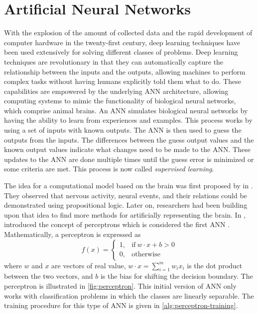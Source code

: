 \section{Artificial Neural Networks}

With the explosion of the amount of collected data and the rapid development of computer hardware in the twenty-first century, deep learning techniques have been used extensively for solving different classes of problems.
Deep learning techniques are revolutionary in that they can automatically capture the relationship between the inputs and the outputs, allowing machines to perform complex tasks without having humans explicitly told them what to do.
These capabilities are empowered by the underlying \gls{ANN} architecture, allowing computing systems to mimic the functionality of biological neural networks, which comprise animal brains.
An \gls{ANN} simulates biological neural networks by having the ability to learn from experiences and examples.
This process works by using a set of inputs with known outputs.
The \gls{ANN} is then used to guess the outputs from the inputs.
The differences between the guess output values and the known output values indicate what changes need to be made to the \gls{ANN}.
These updates to the \gls{ANN} are done multiple times until the guess error is minimized or some criteria are met.
This process is now called \textit{supervised learning}.

The idea for a computational model based on the brain was first proposed by \citeauthor{mcculloch1943logical} in \citeyear{mcculloch1943logical} \cite{mcculloch1943logical}.
They observed that nervous activity, neural events, and their relations could be demonstrated using propositional logic.
Later on, researchers had been building upon that idea to find more methods for artificially representing the brain.
In \citeyear{rosenblattPerceptronProbabilisticModel1958}, \citeauthor{rosenblattPerceptronProbabilisticModel1958} introduced the concept of perceptrons which is considered the first \gls{ANN} \cite{rosenblattPerceptronProbabilisticModel1958}.
Mathematically, a perceptron is expressed as
\begin{equation}
    f(x) = \begin{cases}
        1, & \textrm{if}\ w \cdot x + b > 0 \\
        0, & \textrm{otherwise}
    \end{cases}
    \label{eq:perceptron}
\end{equation}
where $w$ and $x$ are vectors of real value, $w \cdot x = \sum_{i=1}^m{w_i x_i}$ is the dot product between the two vectors, and $b$ is the bias for shifting the decision boundary.
The perceptron is illustrated in \autoref{fig:perceptron}.
This initial version of \gls{ANN} only works with classification problems in which the classes are linearly separable.
The training procedure for this type of \gls{ANN} is given in \autoref{alg:perceptron-training}.

